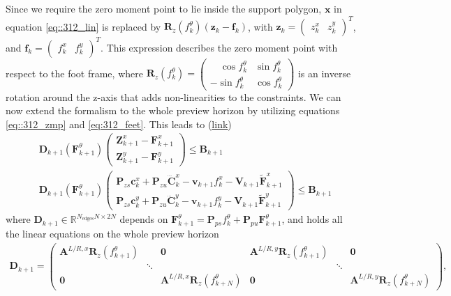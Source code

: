 Since we require the zero moment point to lie inside the support polygon, $\bm{x}$ in equation \ref{eq::312_lin} is replaced by $\bm{R}_z(f_k^\theta)(\bm{z}_k-\bm{f}_k)$, with $\bm{z}_k=\begin{pmatrix}
z_k^x & z_k^y
\end{pmatrix}^T$, and $\bm{f}_k=\begin{pmatrix}
f_k^x & f_k^y
\end{pmatrix}^T$. This expression describes the zero moment point with respect to the foot frame, where $\bm{R}_z(f_k^\theta) = \begin{pmatrix}
\quad\cos f_k^\theta & \sin f_k^\theta \\
-\sin f_k^\theta& \cos f_k^\theta
\end{pmatrix}$ is an inverse rotation around the z-axis that adds non-linearities to the constraints. We can now extend the formalism to the whole preview horizon by utilizing equations \ref{eq::312_zmp} and \ref{eq:312_feet}. This leads to (\href{https://github.com/mhubii/nmpc_pattern_generator/blob/5a213044c927dc6aac9f7e32ce1e5fb472cd67bb/libs/pattern_generator/src/base_generator.cpp#L946}{\underline{link}})
\begin{align}
	&\bm{D}_{k+1}(\bm{F}_{k+1}^{\theta})\begin{pmatrix}
		\bm{Z}_{k+1}^x - \bm{F}_{k+1}^x \\
		\bm{Z}_{k+1}^y - \bm{F}_{k+1}^y
	\end{pmatrix} \leq \bm{B}_{k+1} \\
	&\bm{D}_{k+1}(\bm{F}_{k+1}^{\theta})\begin{pmatrix}
		\bm{P}_{zs} \bm{c}_k^x + \bm{P}_{zu}\dddot{\bm{C}}_k^x - \bm{v}_{k+1}f_k^x-\bm{V}_{k+1}\tilde{\bm{F}}_{k+1}^x \\
		\bm{P}_{zs} \bm{c}_k^y + \bm{P}_{zu}\dddot{\bm{C}}_k^y - \bm{v}_{k+1}f_k^y-\bm{V}_{k+1}\tilde{\bm{F}}_{k+1}^y
	\end{pmatrix} \leq \bm{B}_{k+1}
	\label{eq::312_cop_hull}
\end{align}
where $\bm{D}_{k+1}\in\mathbb{R}^{N_\text{edges}N\times2N}$ depends on $\bm{F}_{k+1}^{\theta} = \bm{P}_{ps}f_k^\theta + \bm{P}_{pu}\bm{F}_{k+1}^\theta$, and holds all the linear equations on the whole preview horizon \begin{align}
\bm{D}_{k+1} = \begin{pmatrix}
	\bm{A}^{L/R,x}\bm{R}_z(f_{k+1}^\theta)&                  &\bm{0}                 &\bm{A}^{L/R,y}\bm{R}_z(f_{k+1}^\theta)&      &\bm{0} \\
	                  &\ddots            &                  &                  &\ddots& \\
	\bm{0}                 &                  &\bm{A}^{L/R,x}\bm{R}_z(f_{k+N}^\theta)&\bm{0}                 &      &\bm{A}^{L/R,y}\bm{R}_z(f_{k+N}^\theta)
\end{pmatrix},
\label{eq::312_rot1}
\end{align}

